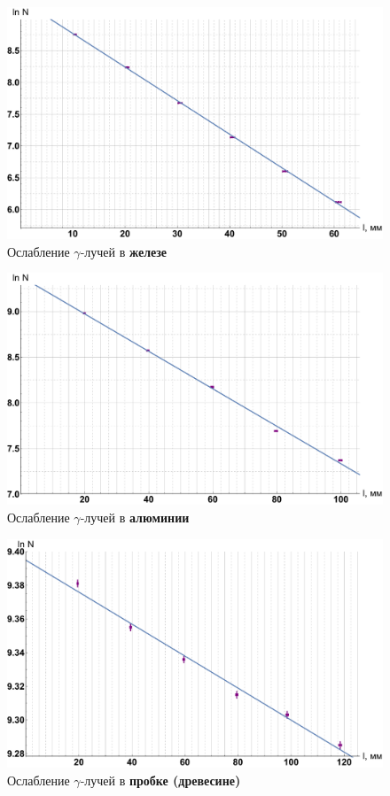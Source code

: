 \documentclass[12pt]{kiarticle}
\newcommand{\ga}{\ensuremath{\gamma}}
\begin{document}
\begin{figure}[h!]
	\label{graf_fe}
	\includegraphics[scale=0.47]{fe.pdf}
	\caption{Ослабление \ga-лучей в \textbf{железе}}
\end{figure}

\begin{figure}[h!]
	\label{graf_al}
	\includegraphics[scale=0.47]{al.pdf}
	\caption{Ослабление \ga-лучей в \textbf{алюминии}}
\end{figure}

	\begin{figure}[h!]
	\label{graf_d}
	\includegraphics[scale=0.47]{d.pdf}
	\caption{Ослабление \ga-лучей в \textbf{пробке (древесине)}}
\end{figure}
\end{document}
